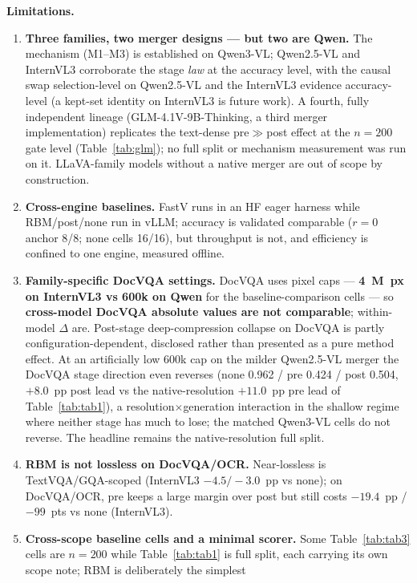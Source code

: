 \documentclass[sigconf,review,anonymous]{acmart}
\begin{document}
\textbf{Limitations.}
\begin{enumerate}
  \item \textbf{Three families, two merger designs --- but two are Qwen.} The
    mechanism (M1--M3) is established on Qwen3-VL; Qwen2.5-VL and InternVL3
    corroborate the stage \emph{law} at the accuracy level, with the causal swap
    selection-level on Qwen2.5-VL and the InternVL3 evidence accuracy-level (a
    kept-set identity on InternVL3 is future work). A fourth, fully
    independent lineage (GLM-4.1V-9B-Thinking, a third merger implementation)
    replicates the text-dense pre$\gg$post effect at the $n = 200$ gate level
    (Table~\ref{tab:glm}); no full split or mechanism measurement was run on
    it. LLaVA-family models without a native merger are out of scope by
    construction.
  \item \textbf{Cross-engine baselines.}
    FastV runs in an HF eager harness while RBM/post/none run in vLLM; accuracy
    is validated comparable ($r = 0$ anchor 8/8; none cells 16/16), but
    throughput is not, and efficiency is confined to one engine, measured
    offline.
  \item \textbf{Family-specific DocVQA settings.} DocVQA uses
    pixel caps --- \textbf{4~M~px on InternVL3 vs 600k on Qwen} for the
    baseline-comparison cells --- so \textbf{cross-model DocVQA absolute values
    are not comparable}; within-model $\Delta$ are. Post-stage deep-compression
    collapse on DocVQA is partly configuration-dependent, disclosed rather than
    presented as a pure method effect. At an artificially low 600k cap on the
    milder Qwen2.5-VL merger the DocVQA stage direction even reverses (none
    0.962 / pre 0.424 / post 0.504, $+8.0$~pp post lead vs the
    native-resolution $+11.0$~pp pre lead of Table~\ref{tab:tab1}), a
    resolution$\times$generation interaction in the shallow regime where neither
    stage has much to lose; the matched Qwen3-VL cells do not reverse. The
    headline remains the native-resolution full split.
  \item \textbf{RBM is not lossless on DocVQA/OCR.} Near-lossless is
    TextVQA/GQA-scoped (InternVL3 $-4.5 / -3.0$~pp vs none); on DocVQA/OCR, pre
    keeps a large margin over post but still costs $-19.4$~pp / $-99$~pts vs
    none (InternVL3).
  \item \textbf{Cross-scope baseline cells and a minimal scorer.} Some
    Table~\ref{tab:tab3} cells are $n = 200$ while Table~\ref{tab:tab1} is full
    split, each carrying its own scope note; RBM is deliberately the simplest

\end{enumerate}
\end{document}
